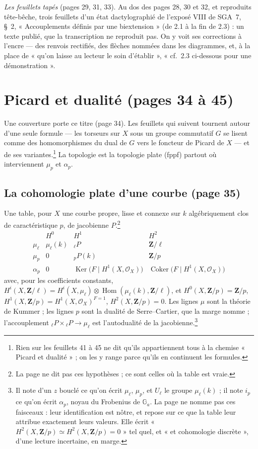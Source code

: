 \documentclass[11pt,a4paper]{article}
\begin{document}
\emph{Les feuillets tapés} (pages 29, 31, 33). Au dos des pages 28, 30 et 32, et
reproduits tête-bêche, trois feuillets d'un état dactylographié de l'exposé VIII
de SGA~7, §~2, « Accouplements définis par une biextension » (de 2.1 à la fin de
2.3) : un texte publié, que la transcription ne reproduit pas. On y voit ses
corrections à l'encre --- des renvois rectifiés, des flèches nommées dans les
diagrammes, et, à la place de « qu'on laisse au lecteur le soin d'établir »,
« cf.~2.3 ci-dessous pour une démonstration ».

\section*{Picard et dualité (pages 34 à 45)}

Une couverture porte ce titre (page 34). Les feuillets qui suivent tournent autour
d'une seule formule --- les torseurs sur $X$ sous un groupe commutatif $G$ se
lisent comme des homomorphismes du dual de $G$ vers le foncteur de Picard de $X$ ---
et de ses variantes.\footnote{Rien sur les feuillets 41 à 45 ne dit qu'ils
appartiennent tous à la chemise « Picard et dualité » ; on les y range parce
qu'ils en continuent les formules.} La topologie est la topologie plate (fppf)
partout où interviennent $\mu_p$ et $\alpha_p$.

\subsection*{La cohomologie plate d'une courbe (page 35)}

Une table, pour $X$ une courbe propre, lisse et connexe sur $k$ algébriquement
clos de caractéristique $p$, de jacobienne $P$.\footnote{La page ne dit pas ces
hypothèses ; ce sont celles où la table est vraie.}
\[
\begin{array}{c|ccc}
 & H^0 & H^1 & H^2 \\
\hline
\mu_\ell & \mu_\ell(k) & {}_\ell P & \mathbf{Z}/\ell \\
\mu_p & 0 & {}_pP(k) & \mathbf{Z}/p \\
\alpha_p & 0 & \operatorname{Ker}\bigl(F \mid H^1(X, \mathcal{O}_X)\bigr) &
\operatorname{Coker}\bigl(F \mid H^1(X, \mathcal{O}_X)\bigr)
\end{array}
\]
avec, pour les coefficients constants, $H^i(X, \mathbf{Z}/\ell) = H^i(X,
\mu_\ell) \otimes \operatorname{Hom}(\mu_\ell(k), \mathbf{Z}/\ell)$, et
$H^0(X, \mathbf{Z}/p) = \mathbf{Z}/p$, $H^1(X, \mathbf{Z}/p) = H^1(X,
\mathcal{O}_X)^{F=1}$, $H^2(X, \mathbf{Z}/p) = 0$. Les lignes $\mu$ sont la
théorie de Kummer ; les lignes $p$ sont la dualité de Serre--Cartier, que la marge
nomme ; l'accouplement ${}_\ell P \times {}_\ell P \to \mu_\ell$ est l'autodualité
de la jacobienne.\footnote{Il note d'un $z$ bouclé ce qu'on écrit $\mu_\ell$,
$\mu_p$, et $U_\ell$ le groupe $\mu_\ell(k)$ ; il note $i_p$ ce qu'on écrit
$\alpha_p$, noyau du Frobenius de $\mathbb{G}_a$. La page ne nomme pas ces
faisceaux : leur identification est nôtre, et repose sur ce que la table leur
attribue exactement leurs valeurs. Elle écrit « $H^2(X, \mathbf{Z}/p) \simeq
H^2(X, \mathbf{Z}/p) = 0$ » tel quel, et « et cohomologie discrète », d'une
lecture incertaine, en marge.}
\end{document}
